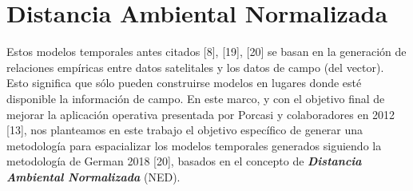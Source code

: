 \chapter{Distancia Ambiental Normalizada}
Estos modelos temporales antes citados [8], [19], [20] se basan en la generación
de relaciones empíricas entre datos satelitales y los datos de campo
(del vector). Esto significa que sólo pueden construirse modelos en lugares
donde esté disponible la información de campo. En este marco, y con el objetivo
final de mejorar la aplicación operativa presentada por Porcasi y colaboradores
en 2012 [13], nos planteamos en este trabajo el objetivo específico de generar
una metodología para espacializar los modelos temporales generados siguiendo la
metodología de German 2018 [20], basados en el concepto de \textbf{\textit{Distancia Ambiental
Normalizada}} (NED).
